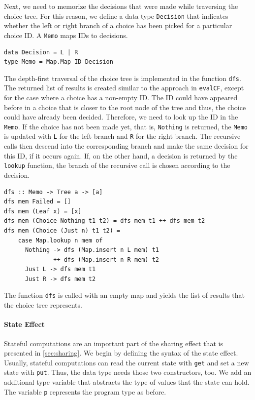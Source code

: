 \documentclass[a4paper, 11pt, fleqn, twoside, abstract=on]{scrreprt}
\newcommand{\todo}[1]{\marginpar{\textbf{TODO:} #1}}
\newcommand{\hinl}[1]{\texttt{#1}}
\begin{document}
Next, we need to memorize the decisions that were made while traversing the choice tree.
For this reason, we define a data type \hinl{Decision} that indicates whether the left or right branch of a choice has been picked for a particular choice ID.
A \hinl{Memo} maps IDs to decisions.

\begin{verbatim}
data Decision = L | R
type Memo = Map.Map ID Decision
\end{verbatim}

The depth-first traversal of the choice tree is implemented in the function \hinl{dfs}.
The returned list of results is created similar to the approach in \hinl{evalCF}, except for the case where a choice has a non-empty ID.
The ID could have appeared before in a choice that is closer to the root node of the tree and thus, the choice could have already been decided.
Therefore, we need to look up the ID in the \hinl{Memo}.
If the choice has not been made yet, that is, \hinl{Nothing} is returned, the \hinl{Memo} is updated with \hinl{L} for the left branch and \hinl{R} for the right branch.
The recursive calls then descend into the corresponding branch and make the same decision for this ID, if it occurs again.
If, on the other hand, a decision is returned by the \hinl{lookup} function, the branch of the recursive call is chosen according to the decision.

\begin{verbatim}
dfs :: Memo -> Tree a -> [a]
dfs mem Failed = []
dfs mem (Leaf x) = [x]
dfs mem (Choice Nothing t1 t2) = dfs mem t1 ++ dfs mem t2
dfs mem (Choice (Just n) t1 t2) =
    case Map.lookup n mem of
      Nothing -> dfs (Map.insert n L mem) t1 
              ++ dfs (Map.insert n R mem) t2
      Just L -> dfs mem t1
      Just R -> dfs mem t2
\end{verbatim}

The function \hinl{dfs} is called with an empty map and yields the list of results that the choice tree represents.
\todo{Examples}

\paragraph{State Effect}
Stateful computations are an important part of the sharing effect that is presented in \autoref{sec:sharing}.
We begin by defining the syntax of the state effect.
Usually, stateful computations can read the current state with \hinl{get} and set a new state with \hinl{put}.
Thus, the data type needs those two constructors, too.
We add an additional type variable that abstracts the type of values that the state can hold.
The variable \hinl{p} represents the program type as before.
\end{document}
